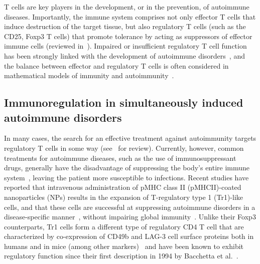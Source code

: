 T cells are key players in the development, or in the prevention, of autoimmune diseases. Importantly, the immune system comprises not only effector T cells that induce destruction of the target tissue, but also regulatory T cells (such as the CD25\pos, Foxp3\pos{} T cells) that promote tolerance by acting as suppressors of effector immune cells (reviewed in~\cite{li2015foxp3+}). Impaired or insufficient regulatory T cell function has been strongly linked with the development of autoimmune disorders~\cite{bennett2001immune, buckner2010mechanisms}, and the balance between effector and regulatory T cells is often considered in mathematical models of immunity and autoimmunity~\cite{su2009mathematical,jaberi2015continuum,pernice2019computational,khadra2009role,alexander2011self, kim2007modeling}.

\subsection*{Immunoregulation in simultaneously induced autoimmune disorders}

In many cases, the search for an effective treatment against autoimmunity targets regulatory T cells in some way (see~\cite{arellano2016regulatory} for review). Currently, however, common treatments for autoimmune diseases, such as the use of immunosuppressant drugs, generally have the disadvantage of suppressing the body’s entire immune system~\cite{wraith2016antigen,Tr1paper}, leaving the patient more susceptible to infections. %
Recent studies have reported that intravenous administration of pMHC class II (pMHCII)-coated nanoparticles (NPs) results in the expansion of T-regulatory type 1 (Tr1)-like cells, and that these cells are successful at suppressing autoimmune disorders in a disease-specific manner~\cite{Tr1paper,umeshappa2019suppression,umeshappa2020ubiquitous,singha2017peptide,serra2015nanoparticle}, without impairing global immunity~\cite{Tr1paper,bayry2016repressing}. Unlike their Foxp3\pos{} counterparts, Tr1 cells form a different type of regulatory CD4\pos{} T cell that are characterized by co-expression of CD49b and LAG-3 cell surface proteins both in humans and in mice (among other markers)~\cite{gagliani2013coexpression} and have been known to exhibit regulatory function since their first description in 1994 by Bacchetta et al.~\cite{bacchetta1994high}.

